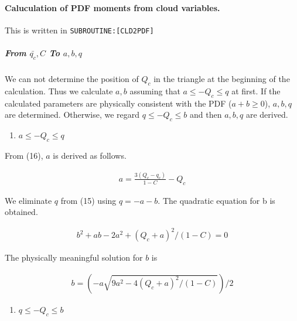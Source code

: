 \hypertarget{caluculation-of-pdf-moments-from-cloud-variables.}{%
\paragraph{Caluculation of PDF moments from cloud
variables.}\label{caluculation-of-pdf-moments-from-cloud-variables.}}

This is written in \texttt{SUBROUTINE:{[}CLD2PDF{]}}

\hypertarget{from-barq_c-c-to-abq}{%
\subparagraph{\texorpdfstring{From \(\bar{q_c}, C\) To
\(a,b,q\)}{From \textbackslash bar\{q\_c\}, C To a,b,q}}\label{from-barq_c-c-to-abq}}

We can not determine the position of \(Q_c\) in the triangle at the
beginning of the calculation. Thus we calculate \(a,b\) assuming that
\(a \leq-Q_{c} \leq q\) at first. If the calculated parameters are
physically consistent with the PDF (\(a+b \ge 0\)), \(a,b,q\) are
determined. Otherwise, we regard \(q \leq-Q_{c} \leq b\) and then
\(a,b,q\) are derived.

\begin{enumerate}
\def\labelenumi{\arabic{enumi}.}
\tightlist
\item
  \(a \leq-Q_{c} \leq q\)
\end{enumerate}

From (16), \(a\) is derived as follows.

\begin{eqnarray}
a =\frac{3\left(Q_{c}-q_{c}\right)}{1-C}-Q_{c}
\end{eqnarray}

We eliminate \(q\) from (15) using \(q = -a-b\). The quadratic equation
for b is obtained.

\begin{eqnarray}
b^{2}+ab-2a^{2}+\left(Q_{c}+a\right)^{2} /(1-C)=0
\label{E08-17}
\end{eqnarray}

The physically meaningful solution for \(b\) is

\begin{eqnarray}
b=\left(-a\sqrt{9 a^{2}-4\left(Q_{c}+a\right)^{2} /(1-C)}\right) / 2
\label{E08-18}
\end{eqnarray}

\begin{enumerate}
\def\labelenumi{\arabic{enumi}.}
\setcounter{enumi}{1}
\tightlist
\item
  \(q \leq-Q_{c} \leq b\)
\end{enumerate}


